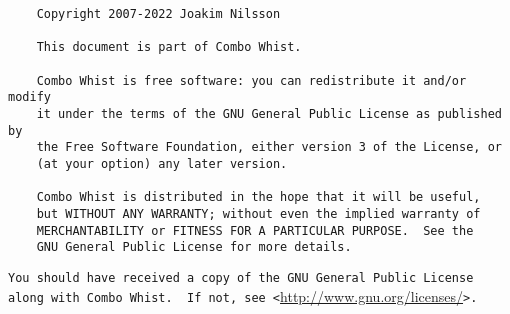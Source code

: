 %
%
%
%

\begin{verbatim}
	Copyright 2007-2022 Joakim Nilsson

	This document is part of Combo Whist.

	Combo Whist is free software: you can redistribute it and/or modify
	it under the terms of the GNU General Public License as published by
	the Free Software Foundation, either version 3 of the License, or
	(at your option) any later version.

	Combo Whist is distributed in the hope that it will be useful,
	but WITHOUT ANY WARRANTY; without even the implied warranty of
	MERCHANTABILITY or FITNESS FOR A PARTICULAR PURPOSE.  See the
	GNU General Public License for more details.
\end{verbatim}
\verb|You should have received a copy of the GNU General Public License|\\
\verb|along with Combo Whist.  If not, see <|\url{http://www.gnu.org/licenses/}\verb|>.|
